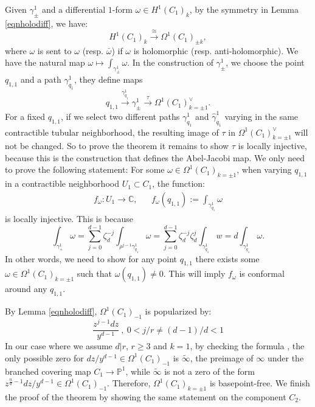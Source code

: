 \documentclass[12pt, letterpaper]{amsart}
\theoremstyle{plain}
\theoremstyle{definition}
\begin{document}
Given $\gamma^1_{\pm}$ and a differential $1$-form $\omega \in H^1(C_1)_k$, by the symmetry in Lemma \ref{eqnholodiff}, we have:
\begin{equation}
    H^1(C_1)_k \xrightarrow[]{\cong} \Omega^1(C_1)_{\pm k},
\end{equation}
where $\omega$ is sent to $\omega$ (resp. $\bar{\omega}$) if $\omega$ is holomorphic (resp. anti-holomorphic). We have the natural map
$\omega \mapsto \int_{\gamma^1_{\pm}} \omega$. 
In the construction of $\gamma^1_{\pm}$,  we choose the point $q_{1,1}$ and a path $\gamma^1_{q_1}$, they define maps 
\begin{equation}
q_{1,1}\xrightarrow[]{\gamma^1_{q_1}} \gamma^1_{\pm} \xrightarrow[]{\tau} \Omega^1(C_1)_{k=\pm 1}^{\vee}.
\end{equation}
For a fixed $q_{1,1}$, if we select two different paths 
$\gamma^{1}_{q_1}$ and $\hat{\gamma}^{1}_{q_1}$ varying in the same contractible tubular neighborhood, the resulting image of $\tau$ in $\Omega^1(C_1)_{k=\pm 1}^{\vee}$ will not be changed.
So to prove the theorem it remains to show $\tau$ is locally injective, because this is the construction that defines the Abel-Jacobi map. 
We only need to prove the following statement: For some $\omega\in \Omega^1(C_1)_{k=\pm 1}$, when varying $q_{1,1}$ in a contractible neighborhood $U_1 \subset C_1$, the function:
\begin{align*}
f_{\omega}: U_1 \longrightarrow \mathbb{C},
&&
f_{\omega}(q_{1,1}):=\int_{\gamma^1_{q_1}}\omega     
\end{align*}
is locally injective. This is because
\begin{equation}
\int_{\gamma_+^1}\omega = \sum_{j=0}^{d-1}\zeta_d^{-j}\int_{\rho^{j-1}\gamma_{q_{1}}^1}\omega = \sum_{j=0}^{d-1}\zeta_d^{-j}\zeta_{d}^{j}\int_{\gamma_{q_1}^1}w = d\int_{\gamma_{q_1}^1}\omega.
\end{equation}
In other words, we need to show for any point $q_{1,1}$ there exists some $\omega\in \Omega^1(C_1)_{k=\pm 1}$ such that $\omega(q_{1,1})\neq 0$. This will imply $f_{\omega}$ is conformal around any $q_{1,1}$.

By Lemma \ref{eqnholodiff}, $\Omega^{1}(C_1)_{-1}$ is popularized by:
\begin{equation}
\frac{z^{j-1}dz}{y^{d-1}} \ , \  
0 <j/r\neq (d-1)/d<1
\end{equation}
In our case where we assume $d|r$, $r\geq 3$ and $k=1$, by checking the formula \cite[(3.2)]{McM13}, the only possible zero for $dz/y^{d-1}\in \Omega^{1}(C_1)_{-1}$ is $\widetilde{\infty}$, the preimage of $\infty$ under the branched covering map $C_1\rightarrow \mathbb{P}^1$, while $\widetilde{\infty}$ is not a zero of the form $z^{\frac{n}{d}-1}dz/y^{d-1}\in \Omega^{1}(C_1)_{-1}$. Therefore, $\Omega^1(C_1)_{k=\pm 1}$ is basepoint-free. We finish the proof of the theorem by showing the same statement on the component $C_2$. 




\end{document}
